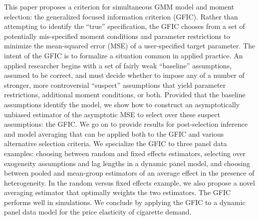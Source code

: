 This paper proposes a criterion for simultaneous GMM model and moment selection: the generalized focused information criterion (GFIC). 
Rather than attempting to identify the ``true'' specification, the GFIC chooses from a set of potentially mis-specified moment conditions and parameter restrictions to minimize the mean-squared error (MSE) of a user-specified target parameter.
The intent of the GFIC is to formalize a situation common in applied practice.
An applied researcher begins with a set of fairly weak ``baseline'' assumptions, assumed to be correct, and must decide whether to impose any of a number of stronger, more controversial ``suspect'' assumptions that yield parameter restrictions, additional moment conditions, or both.
Provided that the baseline assumptions identify the model, we show how to construct an asymptotically unbiased estimator of the asymptotic MSE to select over these suspect assumptions: the GFIC. 
We go on to provide results for post-selection inference and model averaging that can be applied both to the GFIC and various alternative selection criteria.
We specialize the GFIC to three panel data examples: choosing between random and fixed effects estimators, selecting over exogeneity assumptions and lag lengths in a dynamic panel model, and choosing between pooled and mean-group estimators of an average effect in the presence of heterogeneity. 
In the random versus fixed effects example, we also propose a novel averaging estimator that optimally weights the two estimators.
The GFIC performs well in simulations. 
We conclude by applying the GFIC to a dynamic panel data model for the price elasticity of cigarette demand. 

